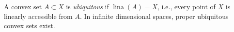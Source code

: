 A convex set $A \subset X$ is \emph{ubiquitous} if $\operatorname{lina}(A) = X$, i.e., every point of $X$ is linearly accessible from $A$. In infinite dimensional spaces, proper ubiquitous convex sets exist.
